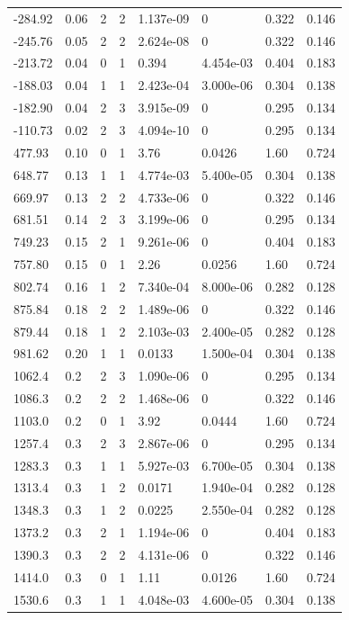 \documentclass[preview]{standalone}
\begin{document}
{{\begin{tabular}{L{1.2cm}C{1.2cm} C{0.3cm}C{0.5cm} C{1.4cm}C{1.4cm} C{1.4cm}C{1.4cm}}
  -284.92  &  0.06  & 2     &  2 &  1.137e-09  & 0  & 0.322 &  0.146   \\ 
  -245.76  &  0.05  & 2     &  2 &  2.624e-08  & 0  & 0.322 &  0.146   \\ 
  -213.72  &  0.04  & 0     &  1 &  0.394  & 4.454e-03  & 0.404 &  0.183   \\ 
  -188.03  &  0.04  & 1     &  1 &  2.423e-04  & 3.000e-06  & 0.304 &  0.138   \\ 
  -182.90  &  0.04  & 2     &  3 &  3.915e-09  & 0  & 0.295 &  0.134   \\ 
  -110.73  &  0.02  & 2     &  3 &  4.094e-10  & 0  & 0.295 &  0.134   \\ 
  477.93  &  0.10  & 0     &  1 &  3.76  & 0.0426  & 1.60 &  0.724   \\ 
  648.77  &  0.13  & 1     &  1 &  4.774e-03  & 5.400e-05  & 0.304 &  0.138   \\ 
  669.97  &  0.13  & 2     &  2 &  4.733e-06  & 0  & 0.322 &  0.146   \\ 
  681.51  &  0.14  & 2     &  3 &  3.199e-06  & 0  & 0.295 &  0.134   \\ 
  749.23  &  0.15  & 2     &  1 &  9.261e-06  & 0  & 0.404 &  0.183   \\ 
  757.80  &  0.15  & 0     &  1 &  2.26  & 0.0256  & 1.60 &  0.724   \\ 
  802.74  &  0.16  & 1     &  2 &  7.340e-04  & 8.000e-06  & 0.282 &  0.128   \\ 
  875.84  &  0.18  & 2     &  2 &  1.489e-06  & 0  & 0.322 &  0.146   \\ 
  879.44  &  0.18  & 1     &  2 &  2.103e-03  & 2.400e-05  & 0.282 &  0.128   \\ 
  981.62  &  0.20  & 1     &  1 &  0.0133  & 1.500e-04  & 0.304 &  0.138   \\ 
  1062.4  &   0.2  & 2     &  3 &  1.090e-06  & 0  & 0.295 &  0.134   \\ 
  1086.3  &   0.2  & 2     &  2 &  1.468e-06  & 0  & 0.322 &  0.146   \\ 
  1103.0  &   0.2  & 0     &  1 &  3.92  & 0.0444  & 1.60 &  0.724   \\ 
  1257.4  &   0.3  & 2     &  3 &  2.867e-06  & 0  & 0.295 &  0.134   \\ 
  1283.3  &   0.3  & 1     &  1 &  5.927e-03  & 6.700e-05  & 0.304 &  0.138   \\ 
  1313.4  &   0.3  & 1     &  2 &  0.0171  & 1.940e-04  & 0.282 &  0.128   \\ 
  1348.3  &   0.3  & 1     &  2 &  0.0225  & 2.550e-04  & 0.282 &  0.128   \\ 
  1373.2  &   0.3  & 2     &  1 &  1.194e-06  & 0  & 0.404 &  0.183   \\ 
  1390.3  &   0.3  & 2     &  2 &  4.131e-06  & 0  & 0.322 &  0.146   \\ 
  1414.0  &   0.3  & 0     &  1 &  1.11  & 0.0126  & 1.60 &  0.724   \\ 
  1530.6  &   0.3  & 1     &  1 &  4.048e-03  & 4.600e-05  & 0.304 &  0.138   \\ 
\hline 
\end{tabular} 

}}
\end{document}
